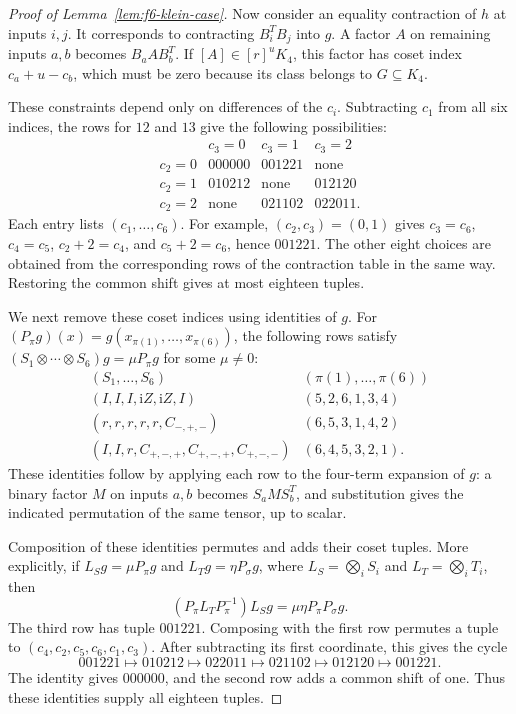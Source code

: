 \begin{proof}[Proof of Lemma~\ref{lem:f6-klein-case}]
Now consider an equality contraction of $h$ at inputs $i,j$.
It corresponds to contracting $B_i^TB_j$ into $g$.
A factor $A$ on remaining inputs $a,b$ becomes $B_aAB_b^T$.
If $[A]\in[r]^uK_4$, this factor has coset index $c_a+u-c_b$,
which must be zero because its class belongs to $G\subseteq K_4$.

These constraints depend only on differences of the $c_i$.
Subtracting $c_1$ from all six indices, the rows for $12$ and $13$
give the following possibilities:
\[
\begin{array}{c|ccc}
 &c_3=0&c_3=1&c_3=2\\ \hline
c_2=0&000000&001221&\text{none}\\
c_2=1&010212&\text{none}&012120\\
c_2=2&\text{none}&021102&022011.
\end{array}
\]
Each entry lists $(c_1,\ldots,c_6)$.
For example, $(c_2,c_3)=(0,1)$ gives
$c_3=c_6$, $c_4=c_5$, $c_2+2=c_4$, and $c_5+2=c_6$,
hence $001221$.
The other eight choices are obtained from the corresponding
rows of the contraction table in the same way.
Restoring the common shift gives at most eighteen tuples.

We next remove these coset indices using identities of $g$.
For $(P_\pi g)(x)=g(x_{\pi(1)},\ldots,x_{\pi(6)})$, the following
rows satisfy
$(S_1\otimes\cdots\otimes S_6)g=\mu P_\pi g$
for some $\mu\ne0$:
\[
\begin{array}{c|c}
(S_1,\ldots,S_6)&(\pi(1),\ldots,\pi(6))\\ \hline
(I,I,I,\mathrm iZ,\mathrm iZ,I)&(5,2,6,1,3,4)\\
(r,r,r,r,r,C_{-,+,-})&(6,5,3,1,4,2)\\
(I,I,r,C_{+,-,+},C_{+,-,+},C_{+,-,-})&(6,4,5,3,2,1).
\end{array}
\]
These identities follow by applying each row to the four-term
expansion of $g$: a binary factor $M$ on inputs $a,b$ becomes
$S_aMS_b^T$, and substitution gives the indicated permutation
of the same tensor, up to scalar.

Composition of these identities permutes and adds their coset
tuples. More explicitly, if
$L_Sg=\mu P_\pi g$ and $L_Tg=\eta P_\sigma g$, where
$L_S=\bigotimes_iS_i$ and $L_T=\bigotimes_iT_i$, then
\[
(P_\pi L_TP_\pi^{-1})L_Sg
=\mu\eta P_\pi P_\sigma g.
\]
The third row has tuple $001221$.
Composing with the first row permutes a tuple to
$(c_4,c_2,c_5,c_6,c_1,c_3)$.
After subtracting its first coordinate, this gives the cycle
\[
001221\longmapsto010212\longmapsto022011
\longmapsto021102\longmapsto012120\longmapsto001221.
\]
The identity gives $000000$, and the second row adds a common
shift of one. Thus these identities supply all eighteen tuples.


\end{proof}
